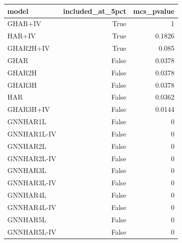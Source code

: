 \begin{tabular}{lrr}
\toprule
model & included_at_5pct & mcs_pvalue \\
\midrule
GHAR+IV & True & 1 \\
HAR+IV & True & 0.1826 \\
GHAR2H+IV & True & 0.085 \\
GHAR & False & 0.0378 \\
GHAR2H & False & 0.0378 \\
GHAR3H & False & 0.0378 \\
HAR & False & 0.0362 \\
GHAR3H+IV & False & 0.0144 \\
GNNHAR1L & False & 0 \\
GNNHAR1L-IV & False & 0 \\
GNNHAR2L & False & 0 \\
GNNHAR2L-IV & False & 0 \\
GNNHAR3L & False & 0 \\
GNNHAR3L-IV & False & 0 \\
GNNHAR4L & False & 0 \\
GNNHAR4L-IV & False & 0 \\
GNNHAR5L & False & 0 \\
GNNHAR5L-IV & False & 0 \\
\bottomrule
\end{tabular}
